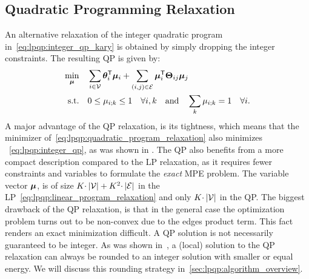 \subsection{Quadratic Programming Relaxation}
\label{sec:lpqp:qp}

An alternative relaxation of the integer quadratic program
in~\eqref{eq:lpqp:integer_qp_kary} is obtained by simply dropping the integer constraints.
The resulting \ac{QP} is given by:
\begin{align}
    \min_{\bm{\mu}} \quad &  \sum_{i\in\mathcal{V}}
    \bm{\theta}_{i}^{\mathsf{T}}\bm{\mu}_{i} +
    \sum_{(i,j) \in
    \mathcal{E}} \bm{\mu}_{i}^{\mathsf{T}}\bm{\Theta}_{ij}
    \bm{\mu}_{j}
    \label{eq:lpqp:quadratic_program_relaxation}
    \\
    \text{s.t.} \quad & 0 \leq \mu_{i;k} \leq 1 \quad \forall i,k
    \quad\text{and}\quad \sum_{k}\mu_{i;k} = 1 \quad \forall i. \notag
\end{align}
A major advantage of the \ac{QP} relaxation, is its tightness, which means 
that the minimizer 
of~\eqref{eq:lpqp:quadratic_program_relaxation} also minimizes
~\eqref{eq:lpqp:integer_qp},
as was shown in \parencite{Ravikumar2006}. 
The \ac{QP} also benefits from a more compact description compared to the \ac{LP}
relaxation, as it requires fewer constraints and variables to formulate the
\emph{exact} \ac{MPE} problem. The variable vector $\bm{\mu}$, is of size 
$K\cdotp|\mathcal{V}| + K^2\cdotp|\mathcal{E}|$ in the \ac{LP}~\eqref{eq:lpqp:linear_program_relaxation}
and only $K\cdotp|\mathcal{V}|$ in the \ac{QP}.
The biggest drawback of the \ac{QP} relaxation, 
is that in the general case the optimization problem turns out to be non-convex due to the edges product
term. This fact renders an exact minimization difficult. A \ac{QP} solution is
not necessarily guaranteed to be integer. As was shown
in~\parencite{Ravikumar2006}, a (local) solution to the \ac{QP} relaxation can always
be rounded to an integer solution with smaller or equal energy. We will
discuss this rounding strategy in~\autoref{sec:lpqp:algorithm_overview}.

